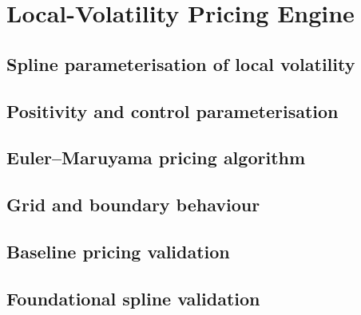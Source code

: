 \chapter{Local-Volatility Pricing Engine}
\label{ch:pricing}

\section{Spline parameterisation of local volatility}
\label{sec:pricing-spline}

\section{Positivity and control parameterisation}
\label{sec:pricing-controls}

\section{Euler--Maruyama pricing algorithm}
\label{sec:pricing-euler}

\section{Grid and boundary behaviour}
\label{sec:pricing-boundary}

\section{Baseline pricing validation}
\label{sec:pricing-validation}

\section{Foundational spline validation}
\label{sec:pricing-spline-validation}
